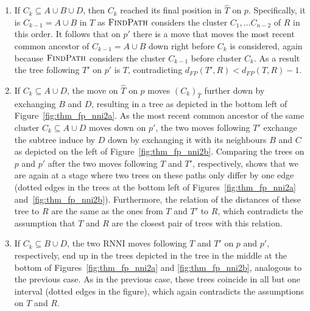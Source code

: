 \documentclass{amsart}
\newcommand{\rnni}{\mathrm{RNNI}}
\newcommand{\findpath}{\textsc{FindPath}}
\begin{document}
\begin{enumerate}
    \begin{enumerate}
        \item
        If $C_k \subseteq A \cup B \cup D$, then $C_k$ reached its final position in $\hat T$ on $p$.
            Specifically, it is $C_{k-1} = A \cup B$ in $T$ as $\findpath$ considers the cluster $C_1,\ldots C_{n-2}$ of $R$ in this order.
            It follows that on $p'$ there is a move that moves the most recent common ancestor of $C_{k-1} = A \cup B$ down right before $C_k$ is considered, again because $\findpath$ considers the cluster $C_{k-1}$ before cluster $C_k$.
            As a result the tree following $T'$ on $p'$ is $T$, contradicting $d_{FP}(T',R) < d_{FP}(T,R) - 1$.
        \item
            If $C_k \subseteq A \cup D$, the move on $\hat T$ on $p$ moves $(C_k)_{\hat T}$ further down by exchanging $B$ and $D$, resulting in a tree as depicted in the bottom left of Figure~\ref{fig:thm_fp_nni2a}.
            As the most recent common ancestor of the same cluster $C_k \subseteq A \cup D$ moves down on $p'$, the two moves following $T'$ exchange the subtree induce by $D$ down by exchanging it with its neighbours $B$ and $C$ as depicted on the left of Figure~\ref{fig:thm_fp_nni2b}.
            Comparing the trees on $p$ and $p'$ after the two moves following $T$ and $T'$, respectively, shows that we are again at a stage where two trees on these paths only differ by one edge (dotted edges in the trees at the bottom left of Figures~\ref{fig:thm_fp_nni2a} and~\ref{fig:thm_fp_nni2b}).
            Furthermore, the relation of the distances of these tree to $R$ are the same as the ones from $T$ and $T'$ to $R$, which contradicts the assumption that $T$ and $R$ are the closest pair of trees with this relation.
        \item
            If $C_k \subseteq B \cup D$, the two $\rnni$ moves following $T$ and $T'$ on $p$ and $p'$, respectively, end up in the trees depicted in the tree in the middle at the bottom of Figures~\ref{fig:thm_fp_nni2a} and \ref{fig:thm_fp_nni2b}, analogous to the previous case.
            As in the previous case, these trees coincide in all but one interval (dotted edges in the figure), which again contradicts the assumptions on $T$ and $R$.
    \end{enumerate}


\end{enumerate}
\end{document}
